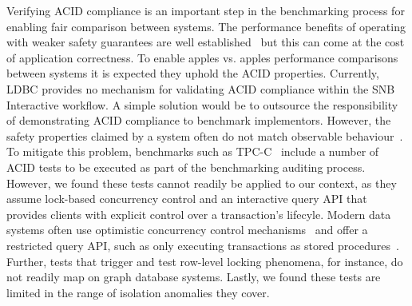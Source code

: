 Verifying ACID compliance is an important step in the benchmarking process for enabling fair comparison between systems.
The performance benefits of operating with weaker safety guarantees are well established~\cite{DBLP:conf/ds/GrayLPT76} but this can come at the cost of application correctness.
To enable apples vs. apples performance comparisons between systems it is expected they uphold the ACID properties.
Currently, LDBC provides no mechanism for validating ACID compliance within the SNB Interactive workflow.
A simple solution would be to outsource the responsibility of demonstrating ACID compliance to benchmark implementors.
However, the safety properties claimed by a system often do not match observable behaviour~\cite{kingsbury}.
To mitigate this problem, benchmarks such as \mbox{TPC-C}~\cite{tpcc} include a number of ACID tests to be executed as part of the benchmarking auditing process.
However, we found these tests cannot readily be applied to our context, as they assume lock-based concurrency control and an interactive query API that provides clients with explicit control over a transaction's lifecyle.
Modern data systems often use optimistic concurrency control mechanisms~\cite{DBLP:journals/sigmod/PavloA16} and offer a restricted query API, such as only executing transactions as stored procedures~\cite{DBLP:conf/vldb/StonebrakerMAHHH07}.
Further, tests that trigger and test row-level locking phenomena, for instance, do not readily map on graph database systems.
Lastly, we found these tests are limited in the range of isolation anomalies they cover.


